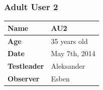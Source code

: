 \subsubsection{Adult User 2}

\begin{table}[H]
\centering
\begin{tabular}{| p{4.0cm} | p{4.0cm} |}
\hline
 \textbf{Name} & AU2 \\
 \hline
 \textbf{Age} & 35 years old \\
 \hline 
 \textbf{Date} & May 7th, 2014 \\
 \hline
 \textbf{Testleader} & Aleksander \\
 \hline
 \textbf{Observer} & Esben \\
 \hline
\end{tabular}
\end{table}


